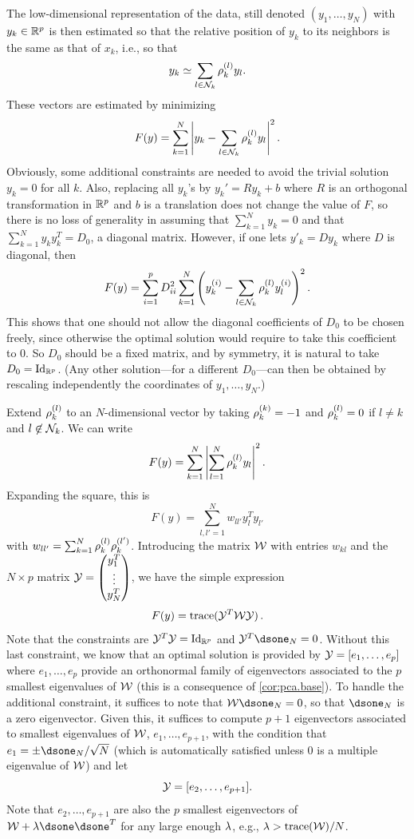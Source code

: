 The low-dimensional representation of the data, still denoted $(y_1, \ldots, y_N)$ with $y_k\in{\mathbb{R}}^p$ is then estimated so that the relative position of $y_k$ to its neighbors is the same as that of $x_k$, i.e., so that
\[
y_k \simeq \sum_{l\in{\mathcal N}_k} \rho_{k}^{(l)} y_l.
\]
These vectors are estimated by minimizing
\[
F(y) = \sum_{k=1}^N \left| y_k - \sum_{l\in {\mathcal N}_k} \rho_{k}^{(l)} y_l\right|^2.
\]
Obviously, some additional constraints are needed to avoid the trivial solution $y_k = 0$ for all $k$. Also, replacing all $y_k$'s by $y_k' = Ry_k + b$ where $R$ is an orthogonal transformation in ${\mathbb{R}}^p$ and $b$ is a translation does not change the value of $F$, so there is no loss of generality in assuming that $\sum_{k=1}^N y_k = 0$ and that $\sum_{k=1}^N y_ky_k^T = D_0$, a diagonal matrix. However, if one lets $y'_k = Dy_k$ where $D$ is diagonal, then
\[
F(y) = \sum_{i=1}^p D_{ii}^2 \sum_{k=1}^N \left( y_k^{(i)} - \sum_{l\in {\mathcal N}_k} \rho_{k}^{(l)} y_l^{(i)}\right)^2.
\]
This shows that one should not allow the diagonal coefficients of $D_0$ to be chosen freely, since otherwise the optimal solution would require to take this coefficient to $0$. So $D_0$ should be a fixed matrix, and by symmetry, it is natural to take $D_0 = \Id[p]$. (Any other solution---for a different $D_0$---can then be obtained by rescaling independently the coordinates of $y_1, \ldots, y_N$.)

Extend $\rho_{k}^{(l)}$ to an $N$-dimensional vector by taking $\rho_{k}^{(k)} = -1$ and $\rho_{k}^{(l)}=0$ if $l\neq k$ and $l\not \in {\mathcal N}_k$. We can write 
\[
F(y) = \sum_{k=1}^N \left |\sum_{l=1}^N \rho_{k}^{(l)} y_l \right|^2.
\]
Expanding the square, this is
\[
F(y) = \sum_{l,l'=1}^N w_{ll'} y_l^Ty_{l'}
\]
with $w_{ll'} = \sum_{k=1}^N \rho_{k}^{(l)} \rho_{k}^{(l')}$. Introducing the matrix ${\mathcal W}$ with entries $w_{kl}$ and the $N\times p$ matrix ${\mathcal Y} = \begin{pmatrix}
y_1^T \\\vdots \\y_N^T
\end{pmatrix}
$, we have the simple expression
\[
F(y) =  {\mathrm{trace}}({\mathcal Y}^T {\mathcal W} {\mathcal Y})\,.
\]
Note that the constraints are $\CY^T\CY = \Id[p]$ and $\CY^T \dsone_N = 0$. Without this last constraint, we know that an optimal solution is provided by ${\mathcal Y} = [e_1, \ldots, e_p]$ where $e_1,\ldots, e_p$ provide an orthonormal family of eigenvectors associated to the $p$ smallest eigenvalues of ${\mathcal W}$ (this is a consequence of \cref{cor:pca.base}).  To handle the additional constraint, it suffices to note that $\CW \dsone_N = 0$, so that $\dsone_N$ is a zero eigenvector. Given this, it suffices to compute   $p+1$ eigenvectors associated to smallest eigenvalues of ${\mathcal W}$, $e_1,\ldots, e_{p+1}$, with the condition that $e_1 = \pm \dsone_N/\sqrt N$ (which is automatically satisfied unless 0 is a multiple eigenvalue of ${\mathcal W}$) and let 
\[
{\mathcal Y} = [e_2, \ldots, e_{p+1}].
\]
Note that $e_2, \ldots, e_{p+1}$ are also the $p$ smallest eigenvectors of $\CW + \la \dsone\dsone^T$ for any large enough $\lambda$, e.g., $\lambda > {\mathrm{trace}}({\mathcal W})/N$.

